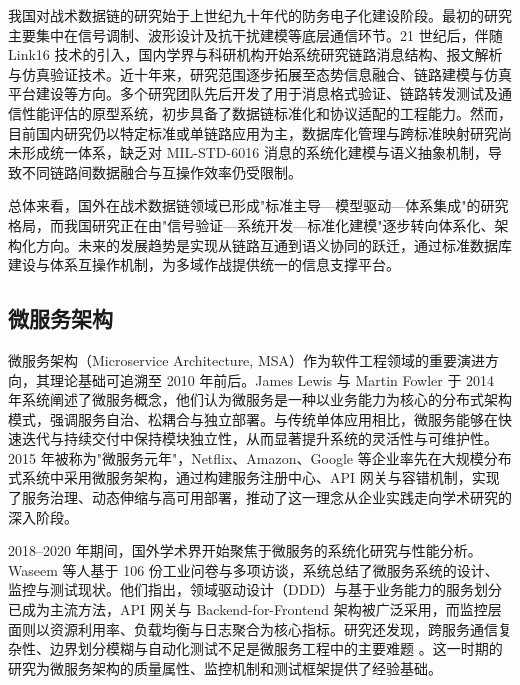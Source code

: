 我国对战术数据链的研究始于上世纪九十年代的防务电子化建设阶段。最初的研究主要集中在信号调制、波形设计及抗干扰建模等底层通信环节\cite{wray_sheppard_1986_jtids_nav,ranger1996_jn}。21 世纪后，伴随 {Link16} 技术的引入，国内学界与科研机构开始系统研究链路消息结构、报文解析与仿真验证技术\cite{fried1978_taes,fried1984_navigation}。近十年来，研究范围逐步拓展至态势信息融合、链路建模与仿真平台建设等方向\cite{doherty1988_jn,L3Harris_MIDS_LVT_2025}。多个研究团队先后开发了用于消息格式验证、链路转发测试及通信性能评估的原型系统，初步具备了数据链标准化和协议适配的工程能力。然而，目前国内研究仍以特定标准或单链路应用为主，数据库化管理与跨标准映射研究尚未形成统一体系，缺乏对 MIL-STD-6016 消息的系统化建模与语义抽象机制，导致不同链路间数据融合与互操作效率仍受限制。

总体来看，国外在战术数据链领域已形成"标准主导—模型驱动—体系集成"的研究格局，而我国研究正在由"信号验证—系统开发—标准化建模"逐步转向体系化、架构化方向。未来的发展趋势是实现从链路互通到语义协同的跃迁，通过标准数据库建设与体系互操作机制，为多域作战提供统一的信息支撑平台。

\subsection{微服务架构}

微服务架构（Microservice Architecture, MSA）作为软件工程领域的重要演进方向，其理论基础可追溯至 2010 年前后。James Lewis 与 Martin Fowler 于 2014 年系统阐述了微服务概念，他们认为微服务是一种以业务能力为核心的分布式架构模式，强调服务自治、松耦合与独立部署。与传统单体应用相比，微服务能够在快速迭代与持续交付中保持模块独立性，从而显著提升系统的灵活性与可维护性。2015 年被称为"微服务元年"，Netflix、Amazon、Google 等企业率先在大规模分布式系统中采用微服务架构，通过构建服务注册中心、API 网关与容错机制，实现了服务治理、动态伸缩与高可用部署，推动了这一理念从企业实践走向学术研究的深入阶段。

2018–2020 年期间，国外学术界开始聚焦于微服务的系统化研究与性能分析。Waseem 等人基于 106 份工业问卷与多项访谈，系统总结了微服务系统的设计、监控与测试现状。他们指出，领域驱动设计（DDD）与基于业务能力的服务划分已成为主流方法，API 网关与 Backend-for-Frontend 架构被广泛采用，而监控层面则以资源利用率、负载均衡与日志聚合为核心指标。研究还发现，跨服务通信复杂性、边界划分模糊与自动化测试不足是微服务工程中的主要难题 \cite{Waseem2021Design}。这一时期的研究为微服务架构的质量属性、监控机制和测试框架提供了经验基础。

